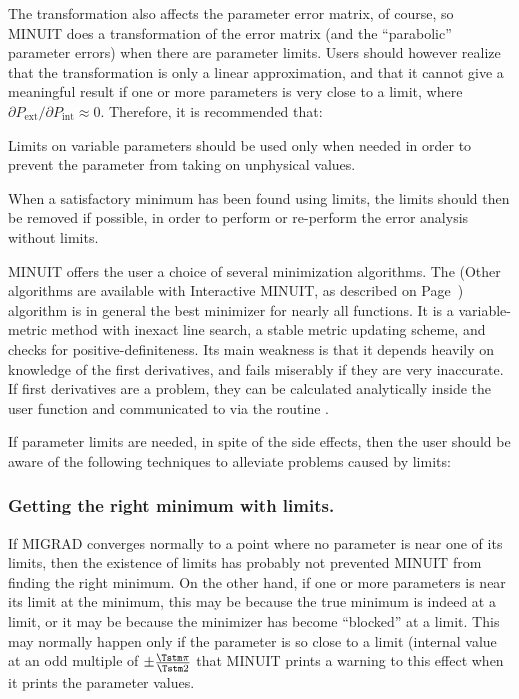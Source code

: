 The transformation also affects the parameter error matrix, of course,
so MINUIT does a transformation of the error matrix (and the 
``parabolic'' parameter errors) when there are parameter limits.
Users should however realize that the transformation is only a linear
approximation, and that it cannot give a meaningful result if one or more
parameters is very close to a limit, where
$\partial P_{\mathrm{ext}} / \partial P_{\mathrm{int}} \approx 0$.
Therefore, it is recommended that:
\begin{UL}
\item Limits on variable parameters should be used only when needed in order
to prevent the parameter from taking on unphysical values.
\item When a satisfactory minimum has been found using limits, the limits
should then be removed if possible, in order to perform or re-perform the
error analysis without limits.
\end{UL}


MINUIT offers the user a choice of several minimization algorithms.
The  (Other algorithms are available with 
Interactive MINUIT, as described on Page~\pageref{H2MWMIN})
algorithm is in general the best minimizer for nearly all functions. 
It is a 
variable-metric method with inexact line search, a stable
metric updating scheme, and checks for positive-definiteness.
Its main weakness is that it depends heavily on knowledge of the
first derivatives, and fails miserably if they are very inaccurate.
If first derivatives are a problem, they can be
calculated analytically inside the user function and communicated
to \PAW{} via the routine .

If parameter limits are needed, in spite of the side effects,
then the user should be aware of the following
techniques to alleviate problems caused by limits:

\subsubsection*{Getting the right minimum with limits.}

If MIGRAD converges normally to a point where no parameter is
near one of its limits, then the existence of limits has
probably not prevented MINUIT from finding the right minimum.
On the other hand, if one or more parameters is near its limit
at the minimum, this may be because the true minimum is indeed
at a limit, or it may be because the minimizer has become 
``blocked'' at a limit.  
This may normally happen only if the parameter
is so close to a limit (internal value at an odd multiple
of $\pm \frac{\Tstm \pi}{\Tstm 2}$ that MINUIT prints a warning to this effect
when it prints the parameter values.


